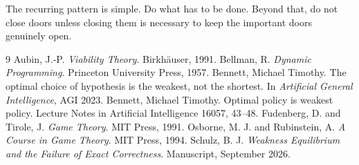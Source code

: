 \documentclass[11pt]{article}
\theoremstyle{definition}
\begin{document}
The recurring pattern is simple. Do what has to be done. Beyond that, do not close doors unless closing them is necessary to keep the important doors genuinely open.

\begin{thebibliography}{9}
 Aubin, J.-P. \emph{Viability Theory}. Birkh\"auser, 1991.
 Bellman, R. \emph{Dynamic Programming}. Princeton University Press, 1957.
 Bennett, Michael Timothy. The optimal choice of hypothesis is the weakest, not the shortest. In \emph{Artificial General Intelligence}, AGI 2023.
 Bennett, Michael Timothy. Optimal policy is weakest policy. Lecture Notes in Artificial Intelligence 16057, 43--48.
 Fudenberg, D. and Tirole, J. \emph{Game Theory}. MIT Press, 1991.
 Osborne, M. J. and Rubinstein, A. \emph{A Course in Game Theory}. MIT Press, 1994.
 Schulz, B. J. \emph{Weakness Equilibrium and the Failure of Exact Correctness}. Manuscript, September 2026.
\end{thebibliography}
\end{document}
